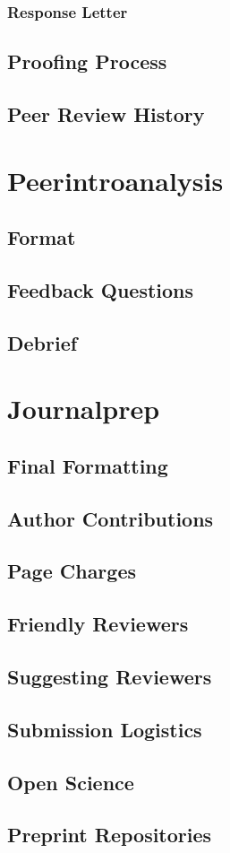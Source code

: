 \documentclass[12pt]{article}
\begin{document}
\subsubsection{Response Letter}
\subsection{Proofing Process}
\subsection{Peer Review History}

\section{Peerintroanalysis}
\subsection{Format}
\subsection{Feedback Questions}
\subsection{Debrief}

\section{Journalprep}
\subsection{Final Formatting}
\subsection{Author Contributions}
\subsection{Page Charges}
\subsection{Friendly Reviewers}
\subsection{Suggesting Reviewers}
\subsection{Submission Logistics}
\subsection{Open Science}
\subsection{Preprint Repositories}
\end{document}
